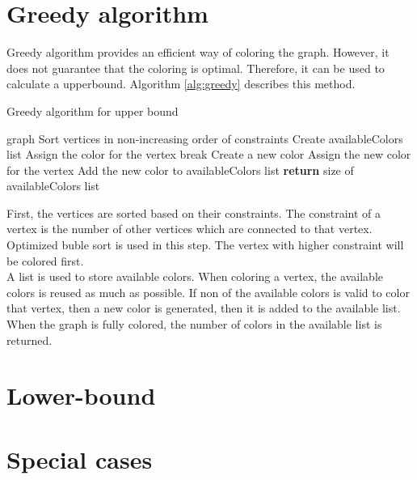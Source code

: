 \documentclass[a4paper]{report}
\begin{document}
		\section{Greedy algorithm}
		Greedy algorithm provides an efficient way of coloring the graph. However,  it does not guarantee that the coloring is optimal. Therefore, it can be used to calculate a upperbound. Algorithm \ref{alg:greedy} describes this method.\\
		\begin{algorithm}
			\caption{Greedy algorithm for upper bound}
			\label{alg:greedy}
			\begin{algorithmic}[1]
				\REQUIRE graph
				\STATE Sort vertices in non-increasing order of constraints
				\STATE Create availableColors list
					\STATE Assign the color for the vertex
					\STATE break
					\ENDIF
					\ENDFOR
					\STATE Create a new color
					\STATE Assign the new color for the vertex
					\STATE Add the new color to availableColors list
					\ENDIF
				\ENDFOR
				\STATE \textbf{return} size of availableColors list
			\end{algorithmic}
		\end{algorithm}
		First, the vertices are sorted based on their constraints. The constraint of a vertex is  the number of other vertices which are connected to that vertex. Optimized buble sort \cite{bubblesort2019} is used in this step. The vertex with higher constraint will be colored first.\\
		A list is used to store available colors. When coloring a vertex, the available colors is reused as much as possible. If non of the available colors is valid to color that vertex, then a new color is generated, then it is added to the available list. When the graph is fully colored, the number of colors in the available list is returned.\\
		
		\section{Lower-bound}
		
		\section{Special cases}
\end{document}
